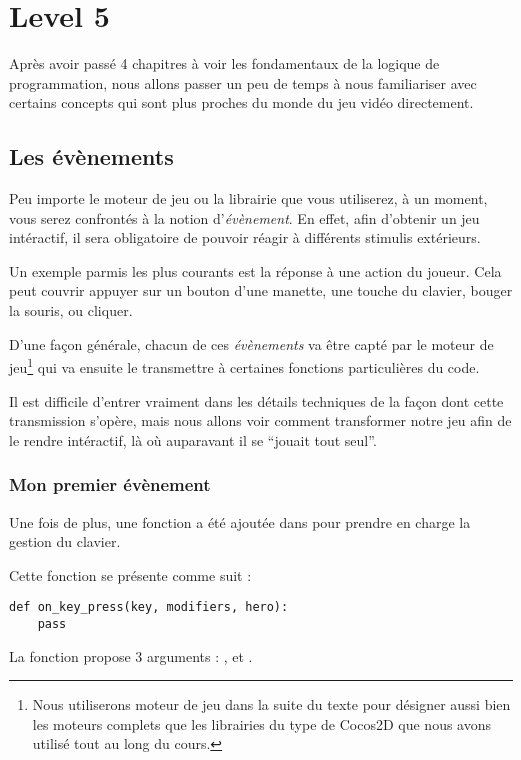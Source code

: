 \chapter{Level 5}

Après avoir passé 4 chapitres à voir les fondamentaux de la logique de programmation, nous allons passer un peu de temps à nous familiariser avec certains concepts qui sont plus proches du monde du jeu vidéo directement.

\section{Les évènements}

Peu importe le moteur de jeu ou la librairie que vous utiliserez, à un moment, vous serez confrontés à la notion d'\emph{évènement}. En effet, afin d'obtenir un jeu intéractif, il sera obligatoire de pouvoir réagir à différents stimulis extérieurs.

Un exemple parmis les plus courants est la réponse à une action du joueur. Cela peut couvrir appuyer sur un bouton d'une manette, une touche du clavier, bouger la souris, ou cliquer.

D'une façon générale, chacun de ces \emph{évènements} va être capté par le moteur de jeu\footnote{Nous utiliserons moteur de jeu dans la suite du texte pour désigner aussi bien les moteurs complets que les librairies du type de Cocos2D que nous avons utilisé tout au long du cours.} qui va ensuite le transmettre à certaines fonctions particulières du code.

Il est difficile d'entrer vraiment dans les détails techniques de la façon dont cette transmission s'opère, mais nous allons voir comment transformer notre jeu afin de le rendre intéractif, là où auparavant il se ``jouait tout seul''.

\subsection{Mon premier évènement}

Une fois de plus, une fonction a été ajoutée dans  pour prendre en charge la gestion du clavier.

Cette fonction se présente comme suit :

\begin{lstlisting}
def on_key_press(key, modifiers, hero):
    pass
\end{lstlisting}

La fonction propose 3 arguments : ,  et .


